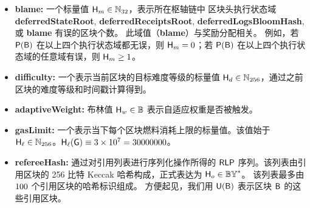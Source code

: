 \begin{itemize}[nosep]
	\item {\bf blame:} 一个标量值 $\textsf{H}_{m}\in\mathbb{N}_{32}$，表示所在枢轴链中
	区块头执行状态域 {\bf deferredStateRoot}, {\bf deferredReceiptsRoot}, {\bf deferredLogsBloomHash}, 或 {\bf blame} 有误的区块个数。
	此域值（{\bf blame}）与奖励分配相关。
	例如，若 $\mathsf{P}{\left({\textsf{B}} \right)}$ 在以上四个执行状态域都无误，则 $\textsf{H}_{m}=0$；若 $\mathsf{P}{\left({\textsf{B}} \right)}$ 在以上四个执行状态域的任意域有误，则 $\textsf{H}_{m} \ge 1$。

	\item {\bf difficulty:} 一个表示当前区块的目标难度等级的标量值 $\textsf{H}_d\in\mathbb{N}_{256}$，通过之前区块的难度等级和时间戳计算得到。

	\item {\bf adaptiveWeight:} 布林值 $\textsf{H}_w\in\mathbb{B}$ 表示自适应权重是否被触发。

	\item {\bf gasLimit:} 一个表示当下每个区块燃料消耗上限的标量值。该值始于 $\textsf{H}_{\ell}\in\mathbb{N}_{256}$。$\textsf{H}_{\ell}(\textsf{G})\equiv 3\times 10^7=30000000$。

	\item {\bf refereeHash:} 通过对引用列表进行序列化操作所得的 $\mathsf{RLP}$ 序列。该列表由引用区块的 256 比特 Keccak 哈希构成，正式表达为 $\textsf{H}_o \in\mathbb{BY}^*$。
	该列表最多由 $100$ 个引用区块的哈希标识组成。
	方便起见，我们用 $\textsf{U}(\textsf{B})$ 表示区块 $\textsf{B}$ 的这些引用区块。
	

\end{itemize}
